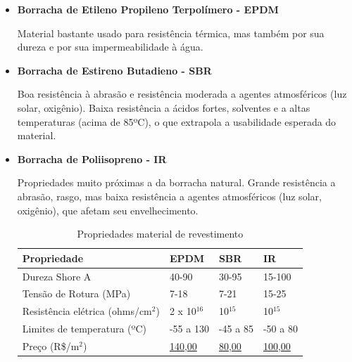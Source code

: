 \begin{itemize}
    \item \textbf{Borracha de Etileno Propileno Terpolímero - EPDM }
    \par Material bastante usado para resistência térmica, mas também por sua dureza e por sua impermeabilidade à água. \cite{EPM}
    \item \textbf{Borracha de Estireno Butadieno - SBR} 
    \par Boa resistência à abrasão e resistência moderada a agentes atmosféricos (luz solar, oxigênio). Baixa resistência a ácidos fortes, solventes e a altas temperaturas (acima de 85ºC), o que extrapola a usabilidade esperada do material. \cite{SBR}
    \item \textbf{Borracha de Poliisopreno - IR}
    \par Propriedades muito próximas a da borracha natural. Grande resistência a abrasão, rasgo, mas baixa resistência a agentes atmosféricos (luz solar, oxigênio), que afetam seu envelhecimento. \cite{IR}

\begin{table}[h!]
\centering
\begin{tabular}{|l|l|l|l|}
\hline
Propriedade & EPDM & SBR & IR \\ \hline
Dureza Shore A & 40-90 & 30-95 & 15-100 \\ \hline
Tensão de Rotura (MPa) & 7-18 & 7-21 & 15-25 \\ \hline
Resistência elétrica (ohms/cm$^2$) & 2 x 10$^{16}$ & 10$^{15}$ & 10$^{15}$ \\ \hline
Limites de temperatura (ºC) & -55 a 130  & -45 a 85 & -50 a 80 \\ \hline
Preço (R\$/m$^2$) & \href{https://produto.mercadolivre.com.br/MLB-695763984-manta-lona-epdm-para-lagos-preco-por-metro-quadrado-_JM#position=1&amp;type=item&amp;tracking_id=6d0c4fc5-9267-481f-bd5d-3235e740025b}{140,00}  & \href{https://produto.mercadolivre.com.br/MLB-1582301221-lencol-de-borracha-manta-30mm-x-1mt-largura-_JM#position=1&amp;amp;type=item&amp;amp;tracking_id=496d45a3-ab4a-4895-879d-bae69aa0cf97}{80,00}  & \href{https://produto.mercadolivre.com.br/MLB-1515451183-lencol-piso-manta-borracha-liso-preto-2mm-x-1000mm-_JM#position=2&amp;type=item&amp;tracking_id=06606e66-abe1-4c02-8649-c7365eef54cb}{100,00}  \\ \hline
\end{tabular}
\caption{Propriedades material de revestimento}
\label{tab:revestimento}
\end{table}

\end{itemize}

